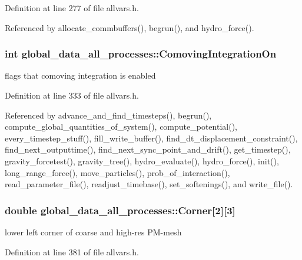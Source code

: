 Definition at line 277 of file allvars.h.



Referenced by allocate\_\-commbuffers(), begrun(), and hydro\_\-force().

\hypertarget{structglobal__data__all__processes_a4104c753df69fb4da0dd9bbb57e2a5f4}{
\subsubsection[{ComovingIntegrationOn}]{\setlength{\rightskip}{0pt plus 5cm}int {\bf global\_\-data\_\-all\_\-processes::ComovingIntegrationOn}}}
\label{structglobal__data__all__processes_a4104c753df69fb4da0dd9bbb57e2a5f4}
flags that comoving integration is enabled 

Definition at line 333 of file allvars.h.



Referenced by advance\_\-and\_\-find\_\-timesteps(), begrun(), compute\_\-global\_\-quantities\_\-of\_\-system(), compute\_\-potential(), every\_\-timestep\_\-stuff(), fill\_\-write\_\-buffer(), find\_\-dt\_\-displacement\_\-constraint(), find\_\-next\_\-outputtime(), find\_\-next\_\-sync\_\-point\_\-and\_\-drift(), get\_\-timestep(), gravity\_\-forcetest(), gravity\_\-tree(), hydro\_\-evaluate(), hydro\_\-force(), init(), long\_\-range\_\-force(), move\_\-particles(), prob\_\-of\_\-interaction(), read\_\-parameter\_\-file(), readjust\_\-timebase(), set\_\-softenings(), and write\_\-file().

\hypertarget{structglobal__data__all__processes_a5ffb63ff788ca6eee831b5d4d0d9e150}{
\subsubsection[{Corner}]{\setlength{\rightskip}{0pt plus 5cm}double {\bf global\_\-data\_\-all\_\-processes::Corner}\mbox{[}2\mbox{]}\mbox{[}3\mbox{]}}}
\label{structglobal__data__all__processes_a5ffb63ff788ca6eee831b5d4d0d9e150}
lower left corner of coarse and high-\/res PM-\/mesh 

Definition at line 381 of file allvars.h.

